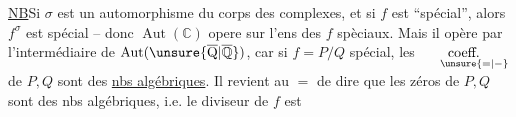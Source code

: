 \uline{NB}\quad Si $\sigma$ est un automorphisme du corps des complexes, et si $f$ est ``spécial'', alors $f^\sigma$ est  spécial -- donc $\operatorname{Aut}(\mathbb C)$ opere sur l'ens des $f$ spèciaux. Mais il opère par l'intermédiaire de $\operatorname{Aut}(\unsure{\overline{\mathrm Q}|\overline{\mathbb Q}})$, car si $f=P/Q$ spécial, les $\underset{\hspace{1.5em}\unsure{=|-}}{\text{coeff.}}$ de $P,Q$ sont des \uline{nbs algébriques}. Il revient au $=$ de dire que les zéros de $P,Q$ sont des nbs algébriques, i.e. le diviseur de $f$ est

